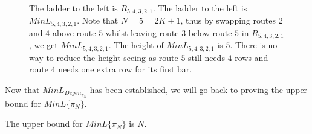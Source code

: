 \begin{center}
\begin{figure}[!htp]
\begin{minipage}{.4\textwidth}
\begin{tikzpicture}
    
                \end{tikzpicture}
            \end{minipage}
            \caption{The ladder to the left is $R_{5,4,3,2,1}$. The ladder to the left is $MinL_{5,4,3,2,1}$. Note that $N=5=2K+1$, thus 
            by swapping routes $2$ and $4$ above route $5$ whilst leaving route $3$ below route $5$ in $R_{5,4,3,2,1}$, we get 
            $MinL_{5,4,3,2,1}$. The height of $MinL_{5,4,3,2,1}$ is $5$. There is no way to reduce the height seeing as route $5$ still needs 
            $4$ rows and route $4$ needs one extra row for its first bar.}
        \end{figure}   

   \end{center}
   Now that $MinL_{Degen_{\pi_{N}}}$ has been established, we will go back to proving the upper bound for 
   $MinL\{\pi_{N}\}$. 
   \begin{lemma}
       The upper bound for $MinL\{\pi_{N}\}$ is $N$.
   \end{lemma}

